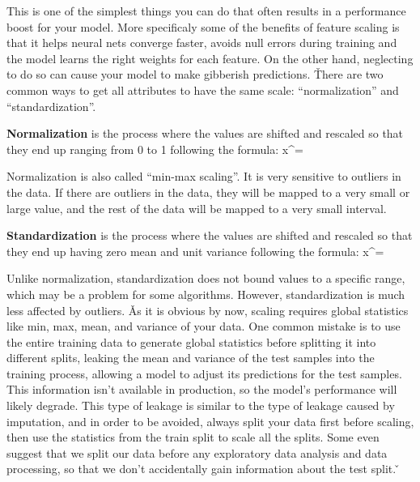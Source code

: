 This is one of the simplest things you can do that often results in a performance boost for your model. More
specificaly some of the benefits of feature scaling is that it helps neural nets converge faster, avoids null errors
during training and the model learns the right weights for each feature. On the other hand, neglecting to do so can
cause your model to make gibberish predictions. \v

There are two common ways to get all attributes to have the same scale: ``normalization'' and ``standardization''.

\bd[Normalization]
\textbf{Normalization} is the process where the values are shifted and rescaled so that they end up ranging from 0 to 1
following the formula:
\bse
x^\prime = 
\ese
\ed

Normalization is also called ``min-max scaling''. It is very sensitive to outliers in the data. If there are
outliers in the data, they will be mapped to a very small or large value, and the rest of the data will be mapped to
a very small interval.


\bd[Standardization]
\textbf{Standardization} is the process where the values are shifted and rescaled so that they end up having zero mean
and unit variance following the formula:
\bse
x^\prime = 
\ese
\ed


Unlike normalization, standardization does not bound values to a specific range, which may be a problem for some
algorithms. However, standardization is much less affected by outliers. \v

As it is obvious by now, scaling requires global statistics like min, max, mean, and variance of your data. One
common mistake is to use the entire training data to generate global statistics before splitting it into different
splits, leaking the mean and variance of the test samples into the training process, allowing a model to adjust its
predictions for the test samples. This information isn't available in production, so the model's performance will
likely degrade. This type of leakage is similar to the type of leakage caused by imputation, and in order to be
avoided, always split your data first before scaling, then use the statistics from the train split to scale all the
splits. Some even suggest that we split our data before any exploratory data analysis and data processing, so that we
don't accidentally gain information about the test split. \v

